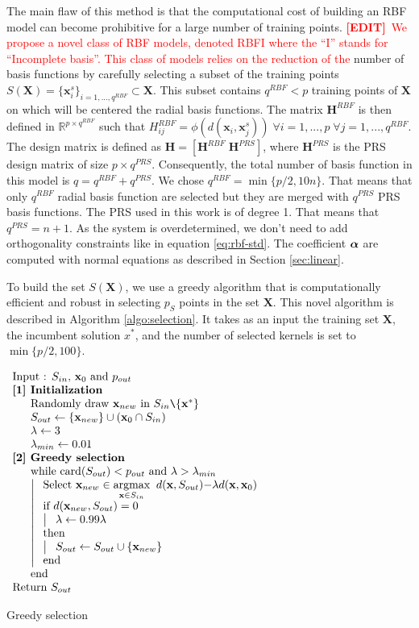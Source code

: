 \documentclass[12pt]{article}
\newcommand{\algoNew}[1]{
  $
  \begin{array}{l}
    #1
  \end{array}
  $
}
\newcommand{\algoLine}[1]{\text{#1}\\}
\newcommand{\algoSection}[2]{\text{\textbf{#1}}\\
  \;\;\;\;\begin{array}{l}
      #2
  \end{array}\\
}
\newcommand{\algoOpen}[2]{
  \algoLine{#1}
  \left|\;
    \begin{array}{l}
      #2
    \end{array}
  \right.  \\
}
\newcommand{\algoEnd}{\algoLine{end}}
\def\R{{\mathbb{R}}}
\newcommand{\x}{\mathbf{x}}
\renewcommand{\H}{\mathbf{H}}
\newcommand{\under}{\texttt{\char`\\}}
\newcommand{\X}{\mathbf{X}}
\renewcommand{\quote}[1]{``#1''}
\newcommand{\mynote}[1]{
  \textbf{\underline{Note}:~#1}
}
\renewcommand{\mynote}[1]{\textcolor{red}{\textbf{[EDIT]}~#1}}
\newcommand{\shortMinus}{\mathord{-}}
\begin{document}
The main flaw of this method is that the computational cost of building an RBF model can become prohibitive for a large number of training points. 
\mynote{We propose a novel class of RBF models, denoted RBFI where the \quote{I} stands for \quote{Incomplete basis}. This class of models relies on the reduction of the} number of basis functions by carefully selecting a subset of the training points $S(\X) = \{\x_i^s \}_{i=1,...,q^{RBF}} \subset \X$. 
This subset contains $q^{RBF} < p$ training points of $\X$ on which will be centered the radial basis functions. 
The matrix $\H^{RBF}$ is then defined in $\R^{p\times q^{RBF}}$ such that $H^{RBF}_{ij} = \phi(d(\x_i,\x_j^s)) \; \forall i=1,...,p \; \forall j=1,...,q^{RBF}$. 
The design matrix is defined as $\H = [\H^{RBF} \; \H^{PRS}]$, where $\H^{PRS}$ is the PRS design matrix of size $p \times q^{PRS}$. 
Consequently, the total number of basis function in this model is $q=q^{RBF}+q^{PRS}$. We chose $q^{RBF} = \min\{p/2 , 10n\} $. 
 That means that only $q^{RBF}$ radial basis function are selected but they are merged with $q^{PRS}$ PRS basis functions. The PRS used in this work is of degree 1. That means that $q^{PRS} = n+1$. As the system is overdetermined, we don't need to add orthogonality constraints like in equation \eqref{eq:rbf-std}. The coefficient $\boldsymbol{\alpha}$ are computed with normal equations as described in Section \ref{sec:linear}. 

To build the set $S(\X)$, we use a greedy algorithm that is computationally efficient and robust in selecting $p_S$ points in the set $\X$. This novel algorithm is described in Algorithm \ref{algo:selection}. It takes as an input the training set $\X$, the incumbent solution $x^*$, and the number of selected kernels is set to $\min\{p/2,100\}$.

\newcommand{\Sin}{S_{in}}
\newcommand{\Sout}{S_{out}}
\newcommand{\pS}{p_{out}}
\newcommand{\xtarget}{\x_{0}}

\begin{algorithm}
\algoNew{
    \algoLine{Input : $\Sin$, $\xtarget$ and $\pS$}
    \algoSection{[1] Initialization}{
      \algoLine{Randomly draw  $\x_{new}$ in $\Sin \under \{\x^*\}$ }
      \algoLine{$\Sout \leftarrow \{\x_{new}\} \cup (\xtarget \cap \Sin)$ }
      \algoLine{$\lambda \leftarrow 3$ }
      \algoLine{$\lambda_{min} \leftarrow 0.01$ }
    }%

    \algoSection{[2] Greedy selection}{
      \algoOpen{while card$(\Sout) < \pS$ and $\lambda>\lambda_{min}$}{
        \algoLine{Select $\x_{new} \in \underset{\x\in\Sin}{\text{argmax}} \;\; d(\x,\Sout)\shortMinus\lambda d(\x,\xtarget)$ }
        \algoOpen{if $d(\x_{new},\Sout) = 0$}{
          \algoLine{$\lambda \leftarrow 0.99\lambda$}
        }
        \algoOpen{then}{
          \algoLine{$\Sout \leftarrow \Sout \cup \{\x_{new}\}$}
        }
        \algoEnd
      }
      \algoEnd
    }%
  	\algoLine{Return $\Sout$}
  }%
  \caption{Greedy selection}
  \label{algo:selection}
\end{algorithm}	
\end{document}
